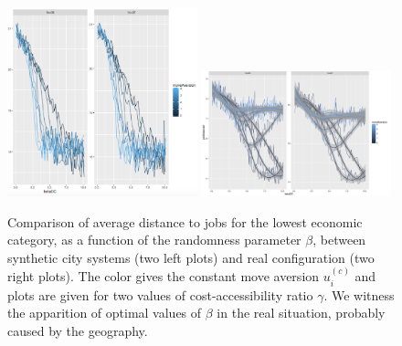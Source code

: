 \begin{figure}[h!]
\centering
\bigskip
\includegraphics[width=0.49\textwidth,height=0.25\textheight]{figures/baseline_jobdist0.png}
\includegraphics[width=0.49\textwidth,height=0.25\textheight]{figures/real_indicjobDistance0_smoothed.png}
\caption{Comparison of average distance to jobs for the lowest economic category, as a function of the randomness parameter $\beta$, between synthetic city systems (two left plots) and real configuration (two right plots). The color gives the constant move aversion $u_i^{(c)}$ and plots are given for two values of cost-accessibility ratio $\gamma$. We witness the apparition of optimal values of $\beta$ in the real situation, probably caused by the geography.}
\label{fig:model}
\end{figure}


\newpage





